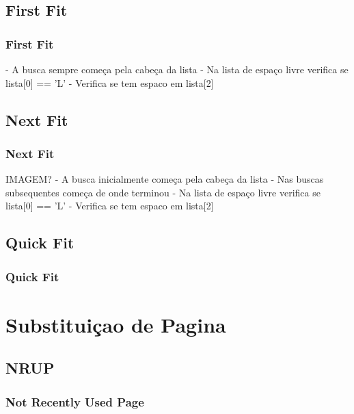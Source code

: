 \documentclass{beamer}
\begin{document}
\subsection{First Fit}
\begin{frame}
\frametitle{First Fit}
- A busca sempre começa pela cabeça da lista
- Na lista de espaço livre verifica se lista[0] == 'L'
- Verifica se tem espaco em lista[2]
 

\justifying
\end{frame}

\subsection{Next Fit} 

\begin{frame}
\frametitle{Next Fit}

IMAGEM?
- A busca inicialmente começa pela cabeça da lista
- Nas buscas subsequentes começa de onde terminou
- Na lista de espaço livre verifica se lista[0] == 'L'
- Verifica se tem espaco em lista[2]


\justifying
\end{frame}

\subsection{Quick Fit}
\begin{frame}
\frametitle{Quick Fit}

\justifying
\end{frame}

\section{Substituiçao de Pagina}
\subsection{NRUP} 

\begin{frame}
\frametitle{Not Recently Used Page}

\justifying
\end{frame}
\end{document}
